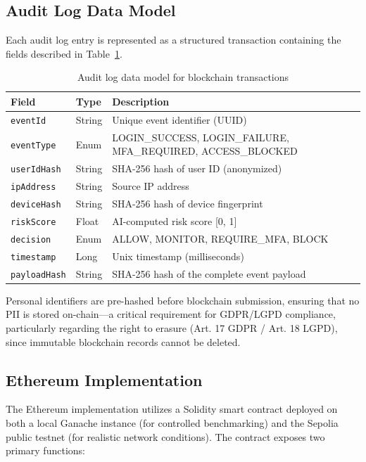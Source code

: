 \documentclass[12pt,a4paper]{article}
\begin{document}
\subsection{Audit Log Data Model}

Each audit log entry is represented as a structured transaction containing the fields described in Table~\ref{tab:log_model}.

\begin{table}[H]
\centering
\caption{Audit log data model for blockchain transactions}
\label{tab:log_model}
\begin{tabular}{@{}llp{6.5cm}@{}}
\toprule
\textbf{Field} & \textbf{Type} & \textbf{Description} \\
\midrule
\texttt{eventId}        & String  & Unique event identifier (UUID) \\
\texttt{eventType}      & Enum    & LOGIN\_SUCCESS, LOGIN\_FAILURE, MFA\_REQUIRED, ACCESS\_BLOCKED \\
\texttt{userIdHash}     & String  & SHA-256 hash of user ID (anonymized) \\
\texttt{ipAddress}      & String  & Source IP address \\
\texttt{deviceHash}     & String  & SHA-256 hash of device fingerprint \\
\texttt{riskScore}      & Float   & AI-computed risk score [0, 1] \\
\texttt{decision}       & Enum    & ALLOW, MONITOR, REQUIRE\_MFA, BLOCK \\
\texttt{timestamp}      & Long    & Unix timestamp (milliseconds) \\
\texttt{payloadHash}    & String  & SHA-256 hash of the complete event payload \\
\bottomrule
\end{tabular}
\end{table}

Personal identifiers are pre-hashed before blockchain submission, ensuring that no PII is stored on-chain---a critical requirement for GDPR/LGPD compliance, particularly regarding the right to erasure (Art. 17 GDPR / Art. 18 LGPD), since immutable blockchain records cannot be deleted.

\subsection{Ethereum Implementation}

The Ethereum implementation utilizes a Solidity smart contract deployed on both a local Ganache instance (for controlled benchmarking) and the Sepolia public testnet (for realistic network conditions). The contract exposes two primary functions:
\end{document}
